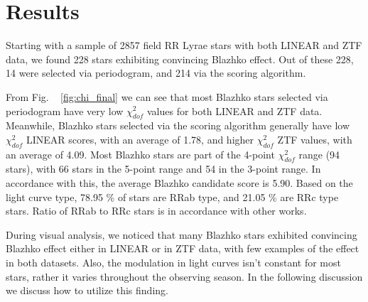 

\section{Results}\label{sec:results}

Starting with a sample of 2857 field RR Lyrae stars with both LINEAR and ZTF data, we found 228 stars exhibiting
convincing Blazhko effect. Out of these 228, 14 were selected via periodogram, and 214 via the scoring algorithm. 

From Fig. ~ \ref{fig:chi_final} we can see that most Blazhko stars selected via periodogram have very low $\chi^2_{dof}$ values for both 
LINEAR and ZTF data. Meanwhile, Blazhko stars selected via the scoring algorithm generally have low $\chi^2_{dof}$ LINEAR scores, with an average of 1.78, and higher $\chi^2_{dof}$ ZTF values,
with an average of 4.09. Most Blazhko stars are part of the 4-point $\chi^2_{dof}$ range (94 stars), with 66 stars in the 5-point range and 54 in the 3-point range. In accordance with this, the
average Blazhko candidate score is 5.90. Based on the light curve type, 78.95 \% of stars are RRab type, and 21.05 \% are RRc type stars. Ratio of RRab to RRc stars is in accordance with other works.

During visual analysis, we noticed that many Blazhko stars exhibited convincing Blazhko effect either in LINEAR or in ZTF data, with few examples of the effect in both datasets. 
Also, the modulation in light curves isn't constant for most stars, rather it varies throughout the observing season. In the following discussion we discuss how to utilize this finding.

